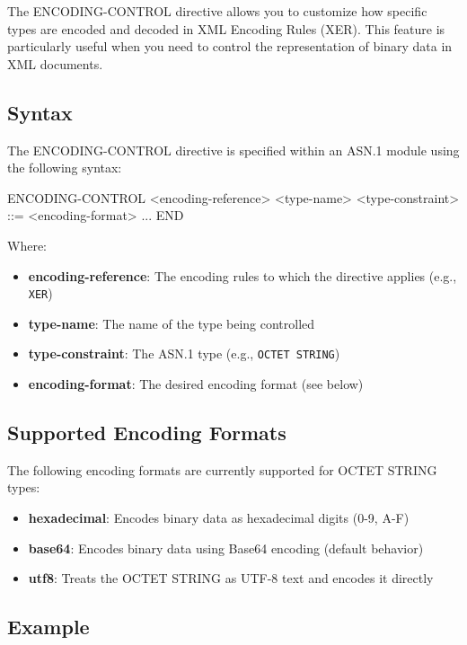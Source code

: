 \documentclass[english,oneside,12pt]{book}
\begin{document}
The ENCODING-CONTROL directive allows you to customize how specific types are encoded 
and decoded in XML Encoding Rules (XER). This feature is particularly useful when you 
need to control the representation of binary data in XML documents.

\subsection*{Syntax}

The ENCODING-CONTROL directive is specified within an ASN.1 module using the following syntax:

\begin{asn}
ENCODING-CONTROL <encoding-reference>
    <type-name> <type-constraint> ::= <encoding-format>
    ...
END
\end{asn}

Where:
\begin{itemize}
\item \textbf{encoding-reference}: The encoding rules to which the directive applies (e.g., \texttt{XER})
\item \textbf{type-name}: The name of the type being controlled
\item \textbf{type-constraint}: The ASN.1 type (e.g., \texttt{OCTET STRING})
\item \textbf{encoding-format}: The desired encoding format (see below)
\end{itemize}

\subsection*{Supported Encoding Formats}

The following encoding formats are currently supported for OCTET STRING types:

\begin{itemize}
\item \textbf{hexadecimal}: Encodes binary data as hexadecimal digits (0-9, A-F)
\item \textbf{base64}: Encodes binary data using Base64 encoding (default behavior)
\item \textbf{utf8}: Treats the OCTET STRING as UTF-8 text and encodes it directly
\end{itemize}

\subsection*{Example}
\end{document}
